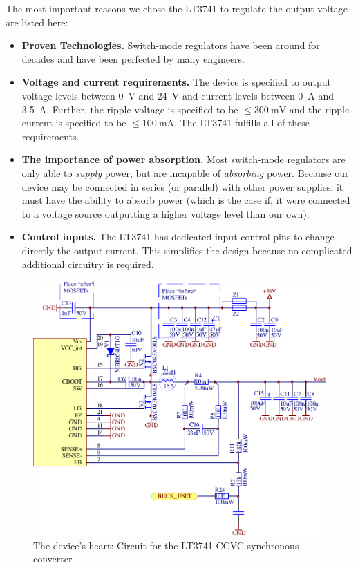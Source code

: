 The most important reasons we chose the LT3741 to regulate the output voltage are listed here:

\begin{itemize}
    \item \textbf{Proven Technologies.}
        Switch-mode  regulators have  been around  for decades  and have  been
        perfected by many engineers.
    \item \textbf{Voltage and current requirements.}
        The device is specified to output voltage levels between \SI{0}{\volt}
        and  \SI{24}{\volt} and  current  levels  between \SI{0}{\ampere}  and
        \SI{3.5}{\ampere}.   Further, the  ripple voltage  is specified  to be
        $\le\SI{300}{\milli\volt}$  and the  ripple  current  is specified  to
        be  $\le\SI{100}{\milli\ampere}$. The  LT3741  fulfills all  of  these
        requirements.
    \item \textbf{The importance of power absorption.}
        Most switch-mode regulators are only  able to \emph{supply} power, but
        are  incapable of  \emph{absorbing} power. Because  our device  may be
        connected in series  (or parallel) with other power  supplies, it must
        have  the ability  to absorb  power  (which is  the case  if, it  were
        connected to a  voltage source outputting a higher  voltage level than
        our own).
    \item \textbf{Control inputs.}
        The LT3741  has dedicated  input control pins  to change  directly the
        output  current. This simplifies  the  design  because no  complicated
        additional circuitry is required.
\end{itemize}

\begin{figure}[th!]
    \center
    \includegraphics[width=.75\textwidth]{images/circuit/buck.pdf}
    \caption{The device's heart: Circuit for the LT3741 CCVC synchronous converter}
    \label{fig:circuit:buck}
\end{figure}


